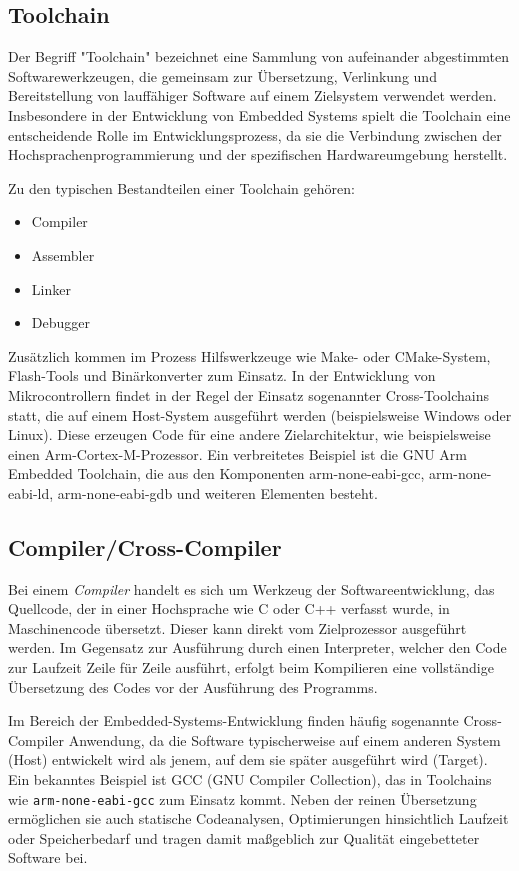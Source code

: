 \subsection*{Toolchain}
Der Begriff "Toolchain" bezeichnet eine Sammlung von aufeinander abgestimmten Softwarewerkzeugen, die gemeinsam zur Übersetzung, Verlinkung und Bereitstellung von lauffähiger Software auf einem Zielsystem verwendet werden. 
Insbesondere in der Entwicklung von Embedded Systems spielt die Toolchain eine entscheidende Rolle im Entwicklungsprozess, da sie die Verbindung zwischen der Hochsprachenprogrammierung und der spezifischen Hardwareumgebung herstellt.

Zu den typischen Bestandteilen einer Toolchain gehören:
\begin{itemize}
	\item Compiler
	\item Assembler
	\item Linker
	\item Debugger
\end{itemize}

Zusätzlich kommen im Prozess Hilfswerkzeuge wie Make- oder CMake-System, Flash-Tools und Binärkonverter zum Einsatz.
In der Entwicklung von Mikrocontrollern findet in der Regel der Einsatz sogenannter Cross-Toolchains statt, die auf einem Host-System ausgeführt werden (beispielsweise Windows oder Linux). 
Diese erzeugen Code für eine andere Zielarchitektur, wie beispielsweise einen Arm-Cortex-M-Prozessor. 
Ein verbreitetes Beispiel ist die GNU Arm Embedded Toolchain, die aus den Komponenten arm-none-eabi-gcc, arm-none-eabi-ld, arm-none-eabi-gdb und weiteren Elementen besteht.

\subsection*{Compiler/Cross-Compiler}
Bei einem \emph{Compiler} handelt es sich um Werkzeug der Softwareentwicklung, das Quellcode, der in einer Hochsprache wie C oder C++ verfasst wurde, in Maschinencode übersetzt. 
Dieser kann direkt vom Zielprozessor ausgeführt werden. Im Gegensatz zur Ausführung durch einen Interpreter, welcher den Code zur Laufzeit Zeile für Zeile ausführt, erfolgt beim Kompilieren eine vollständige Übersetzung des Codes vor der Ausführung des Programms.

Im Bereich der Embedded-Systems-Entwicklung finden häufig sogenannte Cross-Compiler Anwendung, da die Software typischerweise auf einem anderen System (Host) entwickelt wird als jenem, auf dem sie später ausgeführt wird (Target).
Ein bekanntes Beispiel ist GCC (GNU Compiler Collection), das in Toolchains wie \texttt{arm-none-eabi-gcc} zum Einsatz kommt.
Neben der reinen Übersetzung ermöglichen sie auch statische Codeanalysen, Optimierungen hinsichtlich Laufzeit oder Speicherbedarf und tragen damit maßgeblich zur Qualität eingebetteter Software bei.

